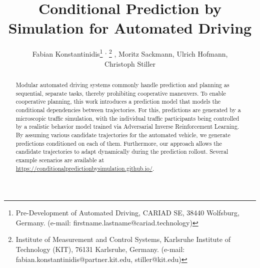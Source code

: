 \documentclass[a4paper,12pt,onecolumn]{article}
\begin{document}
%
\title{Conditional Prediction by Simulation for Automated Driving}

\renewcommand\thefootnote{}  %
\renewcommand\thefootnote{\arabic{footnote}}  %

\author{
    Fabian Konstantinidis\thanks{Pre-Development of Automated Driving, CARIAD SE, 38440 Wolfsburg, Germany. (e-mail: firstname.lastname@cariad.technology)} \textsuperscript{,}%
    \thanks{Institute of Measurement and Control Systems, Karlsruhe Institute of Technology (KIT), 76131 Karlsruhe, Germany. (e-mail: fabian.konstantinidis@partner.kit.edu, stiller@kit.edu)} , 
    Moritz Sackmann\footnotemark[1] , 
    Ulrich Hofmann\footnotemark[1] , \\
    Christoph Stiller\footnotemark[2]
}


%
\date{}

\maketitle \thispagestyle{empty}

\begin{abstract}
Modular automated driving systems commonly handle prediction and planning as sequential, separate tasks, thereby prohibiting cooperative maneuvers. To enable cooperative planning, this work introduces a prediction model that models the conditional dependencies between trajectories. For this, predictions are generated by a microscopic traffic simulation, with the individual traffic participants being controlled by a realistic behavior model trained via Adversarial Inverse Reinforcement Learning. By assuming various candidate trajectories for the automated vehicle, we generate predictions conditioned on each of them. Furthermore, our approach allows the candidate trajectories to adapt dynamically during the prediction rollout. Several example scenarios are available at \href{https://conditionalpredictionbysimulation.github.io/}{https://conditionalpredictionbysimulation.github.io/}.
\end{abstract}
\end{document}
